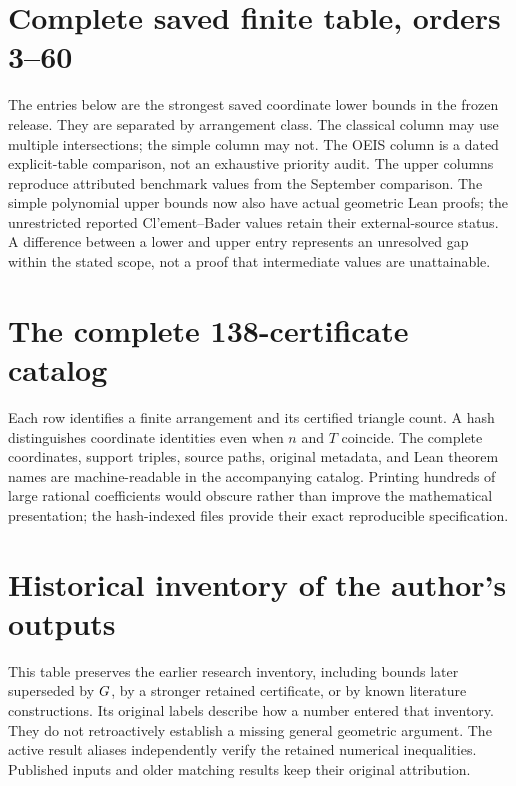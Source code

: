 \section{Complete saved finite table, orders 3--60}\label{app:finite-table}

The entries below are the strongest saved coordinate lower bounds in the frozen release. They are separated by arrangement class. The classical column may use multiple intersections; the simple column may not. The OEIS column is a dated explicit-table comparison, not an exhaustive priority audit. The upper columns reproduce attributed benchmark values from the September comparison. The simple polynomial upper bounds now also have actual geometric Lean proofs; the unrestricted reported Cl'ement--Bader values retain their external-source status. A difference between a lower and upper entry represents an unresolved gap within the stated scope, not a proof that intermediate values are unattainable.



\section{The complete 138-certificate catalog}\label{app:catalog}

Each row identifies a finite arrangement and its certified triangle count. A hash distinguishes coordinate identities even when $n$ and $T$ coincide. The complete coordinates, support triples, source paths, original metadata, and Lean theorem names are machine-readable in the accompanying catalog. Printing hundreds of large rational coefficients would obscure rather than improve the mathematical presentation; the hash-indexed files provide their exact reproducible specification.



\section{Historical inventory of the author's outputs}\label{app:historical}

This table preserves the earlier research inventory, including bounds later superseded by $G$, by a stronger retained certificate, or by known literature constructions. Its original labels describe how a number entered that inventory. They do not retroactively establish a missing general geometric argument. The active result aliases independently verify the retained numerical inequalities. Published inputs and older matching results keep their original attribution.

